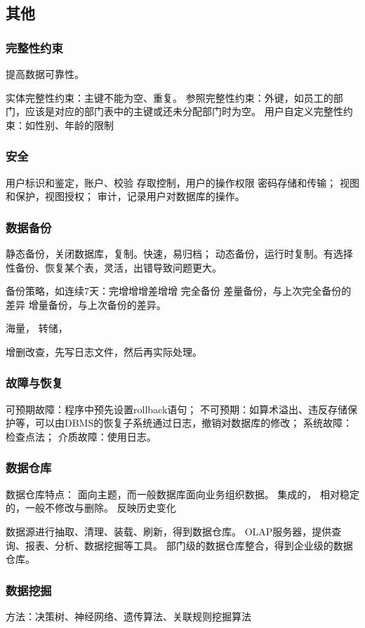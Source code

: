 \documentclass[UTF8]{../computerUniverse}
\begin{document}
\subsection{其他}
\subsubsection{完整性约束}
提高数据可靠性。

实体完整性约束：主键不能为空、重复。
参照完整性约束：外键，如员工的部门，应该是对应的部门表中的主键或还未分配部门时为空。
用户自定义完整性约束：如性别、年龄的限制

\subsubsection{安全}
用户标识和鉴定，账户、校验
存取控制，用户的操作权限
密码存储和传输；
视图和保护，视图授权；
审计，记录用户对数据库的操作。

\subsubsection{数据备份}
静态备份，关闭数据库，复制。快速，易归档；
动态备份，运行时复制。有选择性备份、恢复某个表，灵活，出错导致问题更大。

备份策略，如连续7天：完增增增差增增
完全备份
差量备份，与上次完全备份的差异
增量备份，与上次备份的差异。


海量，
转储，

增删改查，先写日志文件，然后再实际处理。

\subsubsection{故障与恢复}
可预期故障：程序中预先设置rollback语句；
不可预期：如算术溢出、违反存储保护等，可以由DBMS的恢复子系统通过日志，撤销对数据库的修改；
系统故障：检查点法；
介质故障：使用日志。

\subsubsection{数据仓库}
数据仓库特点：
面向主题，而一般数据库面向业务组织数据。
集成的，
相对稳定的，一般不修改与删除。
反映历史变化

数据源进行抽取、清理、装载、刷新，得到数据仓库。
OLAP服务器，提供查询、报表、分析、数据挖掘等工具。
部门级的数据仓库整合，得到企业级的数据仓库。

\subsubsection{数据挖掘}
方法：决策树、神经网络、遗传算法、关联规则挖掘算法
\end{document}
